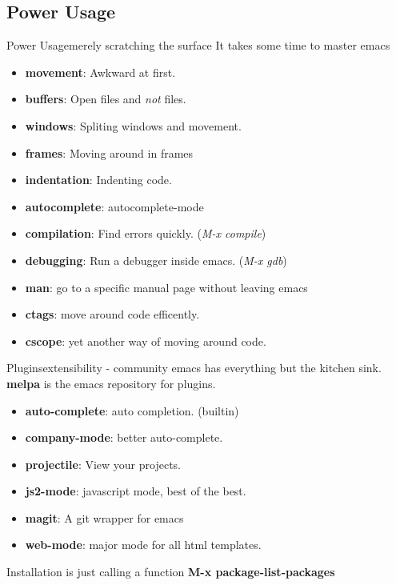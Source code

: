 \documentclass{beamer}
\begin{document}
\subsection{Power Usage}
\begin{frame}{Power Usage}{merely scratching the surface}
	It takes some time to master emacs \pause
	\begin{itemize}
			\item {
					\textbf{movement}: Awkward at first.
					\pause
					}
			\item {
					\textbf{buffers}: Open files and \textit{not} files.
					\pause
					}
			\item {
					\textbf{windows}: Spliting windows and movement.
					\pause
					}
			\item {
					\textbf{frames}: Moving around in frames
					\pause
					}
			\item {
					\textbf{indentation}: Indenting code.
					\pause
					}
			\item {
					\textbf{autocomplete}: autocomplete-mode
					\pause
					}
			\item {
					\textbf{compilation}: Find errors quickly. (\textit{M-x compile})
					\pause
					}
			\item {
					\textbf{debugging}: Run a debugger inside emacs. (\textit{M-x gdb})
					\pause
					}
			\item {
					\textbf{man}: go to a specific manual page without leaving emacs
					\pause
					}
			\item {
					\textbf{ctags}: move around code efficently.
					\pause
					}
			\item {
					\textbf{cscope}: yet another way of moving around code.
					}

	\end{itemize}
\end{frame}
\begin{frame}{Plugins}{extensibility - community}
	emacs has everything but the kitchen sink. \pause
	\textbf{melpa} is the emacs repository for plugins.
	\begin{itemize}
		\item {
				\textbf{auto-complete}: auto completion. (builtin)
				\pause
				}
		\item {
				\textbf{company-mode}: better auto-complete.
				\pause
				}
		\item {
				\textbf{projectile}: View your projects.
				\pause
				}
		\item {
				\textbf{js2-mode}: javascript mode, best of the best.
				\pause
				}
		\item {
				\textbf{magit}: A git wrapper for emacs
				\pause
				}
		\item{
				\textbf{web-mode}: major mode for all html templates.
				\pause
				}
	\end{itemize}
	Installation is just calling a function \textbf{M-x package-list-packages}\\
\end{frame}
\end{document}
